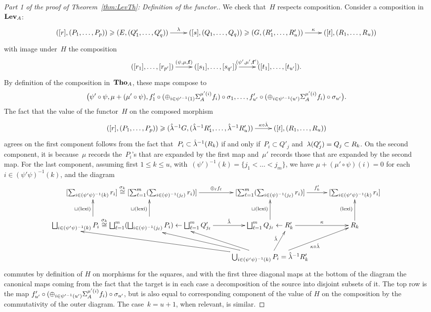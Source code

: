 \begin{proof}[Part 1 of the proof of Theorem~\ref{thm:LevTh}: Definition of the functor.]
We check that~$H$ respects composition. Consider a composition in~$\mathbf{Lev}_A$: 
$$\xymatrix@R-1pc{([r],(P_1,\dots,P_p)) \ge   (E,(Q_1',\dots,Q_q')) %
\ar[r]^-\la & ([s],(Q_1,\dots,Q_q)) \ge  (G,(R_1',\dots,R_u')) \ar[r]^-\kappa  %
&  ([t],(R_1,\dots,R_u))  %
}$$
with image under~$H$ the composition 
$$\xymatrix{([r_1],\dots,[r_{p'}]) \ar[r]^-{(\psi,\mu,{\bf f})} & ([s_1],\dots,[s_{q'}]) \ar[r]^-{(\psi',\mu',{\bf f'})} & ([t_1],\dots,[t_{u'}]).}$$
By definition of the composition in~$\mathbf{Tho}_A$, these maps compose to
\[
\big(\psi'\circ \psi,\mu+(\mu'\circ\psi),f'_1\circ (\oplus_{i\in \psi'^{-1}(1)}\Sigma_A^{\mu'(i)} f_i)\circ\sigma_1,\dots,f'_{u'}\circ (\oplus_{i\in \psi'^{-1}(u')}\Sigma_A^{\mu'(i)}f_i)\circ \sigma_{u'}\big).
\]
The fact that the value of the functor~$H$ on the composed morphism  
$$\xymatrix{([r],(P_1,\dots,P_p)) \ge (\hat\la^{-1}G,(\hat\la^{-1}R_1',\dots,\hat\la^{-1}R_u')) \ar[r]^-{\kappa\circ\hat\la} &  ([t],(R_1,\dots,R_u))  
}$$
agrees on the first component follows from the fact that~\hbox{$P_i\subset \hat{\lambda}^{-1}(R_k)$} if and only if~$P_i\subset Q'_j$ and~$\lambda(Q'_j)=Q_j\subset R_k$. 
On the second component, it is because~$\mu$ records the~$P_i$'s that are expanded by the first map and~$\mu'$ records those that are expanded by the second map. For the last component, assuming first  $1\le k\le u$,  with~$(\psi')^{-1}(k)=\{j_1<\dots<j_m\}$, we have $\mu+(\mu'\circ\psi)(i)=0$ for each $i\in (\psi'\psi)^{-1}(k)$, and the diagram 
$$\xymatrix{[\sum_{i\in (\psi'\psi)^{-1}(k)}r_i]\stackrel{\s_k}\cong  [\sum_{\ell=1}^m(\sum_{i\in (\psi)^{-1}(j_\ell)}r_i)] \ar[r]^-{\oplus_\ell f_\ell} & [\sum_{\ell=1}^m(\sum_{i\in (\psi)^{-1}(j_\ell)}r_i)] \ar[r]^-{f'_k} & [\sum_{i\in (\psi'\psi)^{-1}(k)}r_i]\\
\bigsqcup_{i\in (\psi'\psi)^{-1}(k)}P_i \stackrel{\s_k}\cong \bigsqcup_{\ell=1}^m(\bigsqcup_{i\in (\psi)^{-1}(j_\ell)}P_i) \lar \bigsqcup_{\ell=1}^mQ'_{j_\ell}  \ar[r]^-{\hat \la}
 \ar@<-6ex>[u]^{\sqcup(\textrm{lexi})} \ar@<13ex>[u]^{\sqcup(\textrm{lexi})}
 & \bigsqcup_{\ell=1}^mQ_{j_\ell} \ar[u]^{\sqcup(\textrm{lexi})} \lar R'_k\ar[r]^-\kappa & R_k \ar[u]^{(\textrm{lexi})}\\
& \bigcup_{i\in (\psi'\psi)^{-1}(k)}P_i=\hat\la^{-1}R'_k \ar[ul] \ar[ul]+<-17ex,-2ex> \ar[ul]+<20ex,-2ex> \ar[u]+<5ex,-2ex>^-{\hat \la}  \ar[ur]_{\kappa\circ\hat\la}& 
}$$
commutes by definition of $H$ on morphisms for the squares, and with the first three diagonal maps at the bottom of the diagram  the canonical maps coming from the fact that the target is in each case a decomposition of the source into disjoint subsets of it. The top row is the map $f'_{u'}\circ (\oplus_{i\in \psi'^{-1}(u')}\Sigma_A^{\mu'(i)}f_i)\circ \sigma_{u'}$, but is also equal to corresponding component of the value of $H$ on the composition by the commutativity of the outer diagram. 
The case~$k=u+1$, when relevant, is similar.   
\end{proof}

